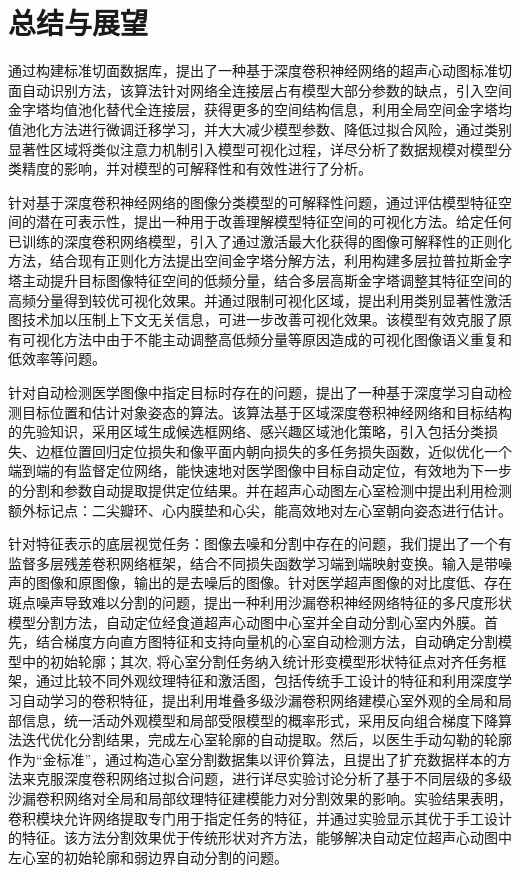 \chapter{总结与展望}
\label{chap:Sum}

通过构建标准切面数据库，提出了一种基于深度卷积神经网络的超声心动图标准切面自动识别方法，该算法针对网络全连接层占有模型大部分参数的缺点，引入空间金字塔均值池化替代全连接层，获得更多的空间结构信息，利用全局空间金字塔均值池化方法进行微调迁移学习，并大大减少模型参数、降低过拟合风险，通过类别显著性区域将类似注意力机制引入模型可视化过程，详尽分析了数据规模对模型分类精度的影响，并对模型的可解释性和有效性进行了分析。

针对基于深度卷积神经网络的图像分类模型的可解释性问题，通过评估模型特征空间的潜在可表示性，提出一种用于改善理解模型特征空间的可视化方法。给定任何已训练的深度卷积网络模型，引入了通过激活最大化获得的图像可解释性的正则化方法，结合现有正则化方法提出空间金字塔分解方法，利用构建多层拉普拉斯金字塔主动提升目标图像特征空间的低频分量，结合多层高斯金字塔调整其特征空间的高频分量得到较优可视化效果。并通过限制可视化区域，提出利用类别显著性激活图技术加以压制上下文无关信息，可进一步改善可视化效果。该模型有效克服了原有可视化方法中由于不能主动调整高低频分量等原因造成的可视化图像语义重复和低效率等问题。

针对自动检测医学图像中指定目标时存在的问题，提出了一种基于深度学习自动检测目标位置和估计对象姿态的算法。该算法基于区域深度卷积神经网络和目标结构的先验知识，采用区域生成候选框网络、感兴趣区域池化策略，引入包括分类损失、边框位置回归定位损失和像平面内朝向损失的多任务损失函数，近似优化一个端到端的有监督定位网络，能快速地对医学图像中目标自动定位，有效地为下一步的分割和参数自动提取提供定位结果。并在超声心动图左心室检测中提出利用检测额外标记点：二尖瓣环、心内膜垫和心尖，能高效地对左心室朝向姿态进行估计。

针对特征表示的底层视觉任务：图像去噪和分割中存在的问题，我们提出了一个有监督多层残差卷积网络框架，结合不同损失函数学习端到端映射变换。输入是带噪声的图像和原图像，输出的是去噪后的图像。针对医学超声图像的对比度低、存在斑点噪声导致难以分割的问题，提出一种利用沙漏卷积神经网络特征的多尺度形状模型分割方法，自动定位经食道超声心动图中心室并全自动分割心室内外膜。首先，结合梯度方向直方图特征和支持向量机的心室自动检测方法，自动确定分割模型中的初始轮廓；其次, 将心室分割任务纳入统计形变模型形状特征点对齐任务框架，通过比较不同外观纹理特征和激活图，包括传统手工设计的特征和利用深度学习自动学习的卷积特征，提出利用堆叠多级沙漏卷积网络建模心室外观的全局和局部信息，统一活动外观模型和局部受限模型的概率形式，采用反向组合梯度下降算法迭代优化分割结果，完成左心室轮廓的自动提取。然后，以医生手动勾勒的轮廓作为“金标准”，通过构造心室分割数据集以评价算法，且提出了扩充数据样本的方法来克服深度卷积网络过拟合问题，进行详尽实验讨论分析了基于不同层级的多级沙漏卷积网络对全局和局部纹理特征建模能力对分割效果的影响。实验结果表明，卷积模块允许网络提取专门用于指定任务的特征，并通过实验显示其优于手工设计的特征。该方法分割效果优于传统形状对齐方法，能够解决自动定位超声心动图中左心室的初始轮廓和弱边界自动分割的问题。

